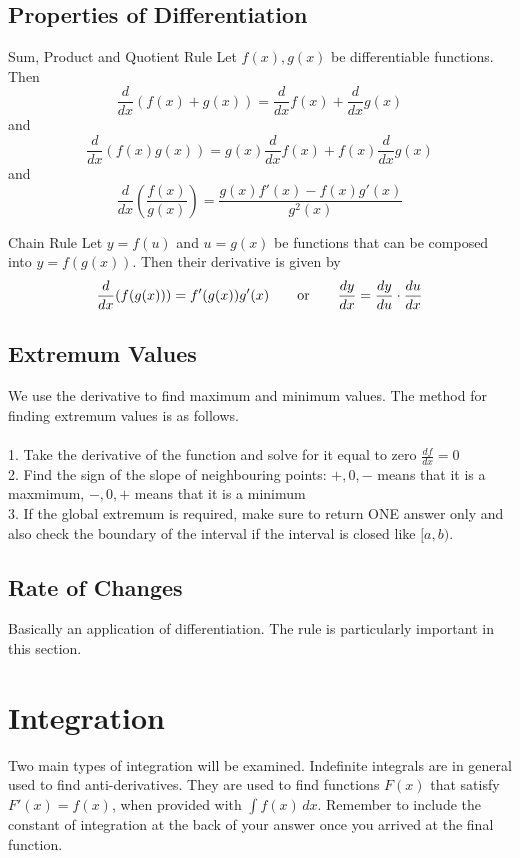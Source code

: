 \documentclass[a4paper]{article}
\begin{document}
\subsection{Properties of Differentiation}
\begin{prp}{Sum, Product and Quotient Rule}{} Let $f(x),g(x)$ be differentiable functions. Then $$\frac{d}{dx}(f(x)+g(x))=\frac{d}{dx}f(x)+\frac{d}{dx}g(x)$$ and $$\frac{d}{dx}(f(x)g(x))=g(x)\frac{d}{dx}f(x)+f(x)\frac{d}{dx}g(x)$$ and $$\frac{d}{dx}\left(\frac{f(x)}{g(x)}\right)=\frac{g(x)f'(x)-f(x)g'(x)}{g^2(x)}$$
\end{prp}

\begin{prp}{Chain Rule}{} Let $y=f(u)$ and $u=g(x)$ be functions that can be composed into $y=f(g(x))$. Then their derivative is given by $$\frac{d}{dx}(f(g(x)))=f'(g(x))g'(x)\text{\qquad or\qquad }\frac{dy}{dx}=\frac{dy}{du}\cdot\frac{du}{dx}$$
\end{prp}

\subsection{Extremum Values}
We use the derivative to find maximum and minimum values. The method for finding extremum values is as follows. \\~\\
1. Take the derivative of the function and solve for it equal to zero $\frac{df}{dx}=0$\\
2. Find the sign of the slope of neighbouring points: $+,0,-$ means that it is a maxmimum, $-,0,+$ means that it is a minimum\\
3. If the global extremum is required, make sure to return ONE answer only and also check the boundary of the interval if the interval is closed like $[a,b)$. 

\subsection{Rate of Changes}
Basically an application of differentiation. The rule is particularly important in this section. 

\pagebreak
\section{Integration}
Two main types of integration will be examined. Indefinite integrals are in general used to find anti-derivatives. They are used to find functions $F(x)$ that satisfy $F'(x)=f(x)$, when provided with $\int f(x)\,dx$. Remember to include the constant of integration at the back of your answer once you arrived at the final function. \linebreak
\end{document}
